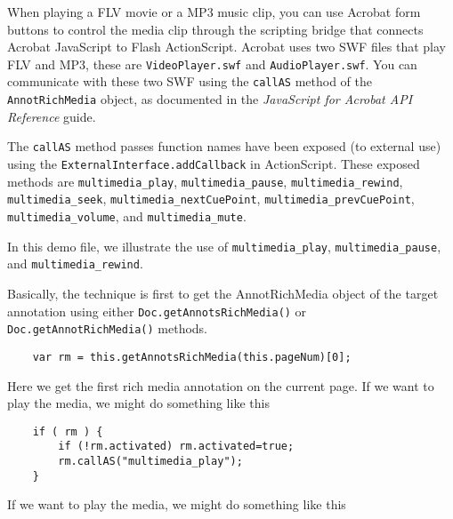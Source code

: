 \documentclass{article}
\begin{document}
\maketitle

\previewtrue

When playing a FLV movie or a MP3 music clip, you can use Acrobat
form buttons to control the media clip through the scripting bridge
that connects Acrobat JavaScript to Flash ActionScript. Acrobat uses
two SWF files that play FLV and MP3, these are
\texttt{VideoPlayer.swf} and \texttt{AudioPlayer.swf}.  You can
communicate with these two SWF using the \texttt{callAS} method of
the \texttt{AnnotRichMedia} object, as documented in the
\textsl{JavaScript for Acrobat API Reference} guide.

The \texttt{callAS} method passes function names have been exposed
(to external use) using the \texttt{ExternalInterface.addCallback}
in ActionScript. These exposed methods are
\texttt{multimedia\_play}, \texttt{multimedia\_pause},
\texttt{multimedia\_rewind}, \texttt{multimedia\_seek},
\texttt{multimedia\_nextCuePoint},
\texttt{multimedia\_prevCuePoint}, \texttt{multimedia\_volume}, and \texttt{multimedia\_mute}.

In this demo file, we illustrate the use of
\texttt{multimedia\_play}, \texttt{multimedia\_pause}, and \texttt{multimedia\_rewind}.

Basically, the technique is first to get the AnnotRichMedia object of the target annotation
using either \texttt{Doc.getAnnotsRichMedia()} or \texttt{Doc.getAnnotRichMedia()} methods.
\begin{verbatim}
    var rm = this.getAnnotsRichMedia(this.pageNum)[0];
\end{verbatim}
Here we get the first rich media annotation on the current page.
If we want to play the media, we might do something like this
\begin{verbatim}
    if ( rm ) {
        if (!rm.activated) rm.activated=true;
        rm.callAS("multimedia_play");
    }
\end{verbatim}
If we want to play the media, we might do something like this
\end{document}
